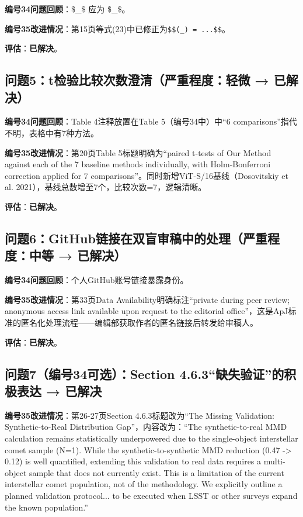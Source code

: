 \documentclass[12pt]{article}
\begin{document}
\textbf{编号34问题回顾}：\$_{\phi}\$ 应为 \$_{}\$。

\textbf{编号35改进情况}：第15页等式(23)中已修正为\texttt{\$\$(_{}) = ...\$\$}。

\textbf{评估}：\textbf{已解决}。

\subsection{问题5：t检验比较次数澄清（严重程度：轻微 → 已解决）}

\textbf{编号34问题回顾}：Table 4注释放置在Table 5（编号34中）中“6 comparisons”指代不明，表格中有7种方法。

\textbf{编号35改进情况}：第20页Table 5标题明确为“paired t-tests of Our Method against each of the 7 baseline methods individually, with Holm-Bonferroni correction applied for 7 comparisons”。同时新增ViT-S/16基线（Dosovitskiy et al. 2021），基线总数增至7个，比较次数=7，逻辑清晰。

\textbf{评估}：\textbf{已解决}。

\subsection{问题6：GitHub链接在双盲审稿中的处理（严重程度：中等 → 已解决）}

\textbf{编号34问题回顾}：个人GitHub账号链接暴露身份。

\textbf{编号35改进情况}：第33页Data Availability明确标注“private during peer review; anonymous access link available upon request to the editorial office”，这是ApJ标准的匿名化处理流程——编辑部获取作者的匿名链接后转发给审稿人。

\textbf{评估}：\textbf{已解决}。

\subsection{问题7（编号34可选）：Section 4.6.3“缺失验证”的积极表达 → 已解决}

\textbf{编号35改进情况}：第26-27页Section 4.6.3标题改为“The Missing Validation: Synthetic-to-Real Distribution Gap”，内容改为：“The synthetic-to-real MMD calculation remains statistically underpowered due to the single-object interstellar comet sample (N=1). While the synthetic-to-synthetic MMD reduction (0.47 -> 0.12) is well quantified, extending this validation to real data requires a multi-object sample that does not currently exist. This is a limitation of the current interstellar comet population, not of the methodology. We explicitly outline a planned validation protocol... to be executed when LSST or other surveys expand the known population.”
\end{document}
